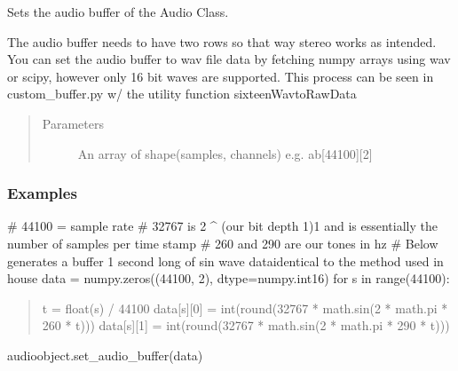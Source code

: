 \documentclass[letterpaper,10pt,english,openany,oneside]{sphinxmanual}
\begin{document}
\begin{fulllineitems}
\begin{fulllineitems}
\begin{quote}
\begin{description}
\end{description}\end{quote}

\end{fulllineitems}



\begin{fulllineitems}

\pysigstartsignatures
{}
\pysigstopsignatures
\sphinxAtStartPar
Sets the audio buffer of the Audio Class.

\sphinxAtStartPar
The audio buffer needs to have two rows so that way stereo works as intended.
You can set the audio buffer to wav file data by fetching numpy arrays using wav or scipy,
however only 16 bit waves are supported. This process can be seen in custom\_buffer.py w/ the
utility function sixteenWavtoRawData
\begin{quote}\begin{description}
\item[{Parameters}] \leavevmode
\sphinxAtStartPar
{} \textendash{} An array of shape(samples, channels) e.g. ab{[}44100{]}{[}2{]}

\end{description}\end{quote}
\subsubsection*{Examples}

\sphinxAtStartPar
\# 44100 = sample rate
\# 32767 is 2 \textasciicircum{} (our bit depth \sphinxhyphen{}1)\sphinxhyphen{}1 and is essentially the number of samples per time stamp
\# 260 and 290 are our tones in hz
\# Below generates a buffer 1 second long of sin wave data\sphinxhyphen{}identical to the method used in house
data = numpy.zeros((44100, 2), dtype=numpy.int16)
for s in range(44100):
\begin{quote}

\sphinxAtStartPar
t = float(s) / 44100
data{[}s{]}{[}0{]} = int(round(32767 * math.sin(2 * math.pi * 260 * t)))
data{[}s{]}{[}1{]} = int(round(32767 * math.sin(2 * math.pi * 290 * t)))
\end{quote}

\sphinxAtStartPar
audioobject.set\_audio\_buffer(data)

\end{fulllineitems}




\end{fulllineitems}
\end{document}

